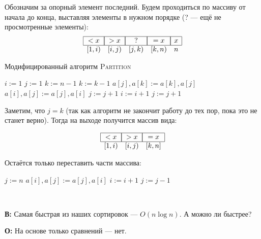 \documentclass[a4paper,12pt]{article}
\begin{document}
Обозначим за опорный элемент последний. Будем проходиться по массиву от начала до конца, выставляя элементы в нужном порядке (? — ещё не просмотренные элементы):
\[\begin{array}{lllll}
    \hline
   	\multicolumn{1}{|c|}{<x} & \multicolumn{1}{|c|}{>x} & \multicolumn{1}{|c|}{  ?  } & \multicolumn{1}{|c|}{=x} & \multicolumn{1}{|c|}{x}\\
    \hline
    [1, i) & [i, j) & [j, k) & [k, n) & n
\end{array}\]

\begin{algorithm}
\caption{Модифицированный алгоритм \textsc{Partition}}
\begin{algorithmic}[1]
\State $i \mathrel{:=} 1$
\State $j \mathrel{:=} 1$
\State $k \mathrel{:=} n - 1$
		\State $k \mathrel{:=} k - 1$
		\State $a[j], a[k] \mathrel{:=} a[k], a[j]$
	\Else {}
		\State $a[i], a[j] \mathrel{:=} a[j], a[i]$
		\State $j \mathrel{:=} j + 1$
		\State $i \mathrel{:=} i + 1$
	\Else
		\State $j \mathrel{:=} j + 1$
	\EndIf
	\EndIf
\EndWhile
\EndFunction
\end{algorithmic}
\end{algorithm}

Заметим, что $j = k$ (так как алгоритм не закончит работу до тех пор, пока это не станет верно). Тогда на выходе получится массив вида:

\[\begin{array}{lll}
    \hline
    \multicolumn{1}{|c|}{<x} & \multicolumn{1}{|c|}{>x} & \multicolumn{1}{|c|}{=x}\\
    \hline
    [1, i) & [i, j) & [k, n]
\end{array}\]

Остаётся только переставить части массива:

\begin{algorithm}
\begin{algorithmic}[1]
\State  $j \mathrel{:=} n$
	\State $a[i], a[j] \mathrel{:=} a[j], a[i]$
	\State $i \mathrel{:=} i + 1$
	\State $j \mathrel{:=} j - 1$
\EndWhile
\end{algorithmic}
\end{algorithm}
 
\

\textbf{В:} Самая быстрая из наших сортировок --- $O(n \log n)$. А можно ли быстрее?

\textbf{О:} На основе только сравнений --- нет. 
\end{document}
